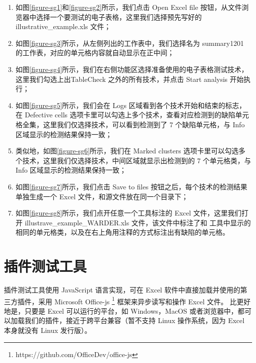 








\begin{enumerate}
    \item 如图\ref{figure-sg1}和\ref{figure-sg2}所示，我们点击 Open Excel file 按钮，从文件浏览器中选择一个要测试的电子表格，这里我们选择预先写好的 illustrative\_example.xls 文件；
    \item 如图\ref{figure-sg3}所示，从左侧列出的工作表中，我们选择名为 summary1201 的工作表，对应的单元格内容就自动显示在正中间；
    \item 如图\ref{figure-sg4}所示，我们在右侧功能区选择准备使用的电子表格测试技术，这里我们勾选上出TableCheck 之外的所有技术，并点击 Start analysis 开始执行；
    \item 如图\ref{figure-sg5}所示，我们会在 Logs 区域看到各个技术开始和结束的标志，在 Defective cells 选项卡里可以勾选上多个技术，查看对应检测到的缺陷单元格全集，这里我们仅选择\wa 技术，可以看到\wa 检测到了 7 个缺陷单元格，与 Info 区域显示的检测结果保持一致；
    \item 类似地，如图\ref{figure-sg6}所示，我们在 Marked clusters 选项卡里可以勾选多个技术，这里我们仅选择\wa 技术，中间区域就显示出\wa 检测到的 7 个单元格类，与 Info 区域显示的检测结果保持一致；
    \item 如图\ref{figure-sg7}所示，我们点击 Save to files 按钮之后，每个技术的检测结果单独生成一个 Excel 文件，和源文件放在同一个目录下；
    \item 如图\ref{figure-sg8}所示，我们点开任意一个工具标注的 Excel 文件，这里我们打开 illustrave\_example\_WARDER.xls 文件，该文件中标注了和 \sg 工具中显示的相同的单元格类，以及在右上角用注释的方式标注出有缺陷的单元格。
\end{enumerate}


\section{\eg 插件测试工具}

\eg 插件测试工具使用 JavaScript 语言实现，可在 Excel 软件中直接加载并使用的第三方插件，采用 Microsoft Office-js \footnote{https://github.com/OfficeDev/office-js} 框架来异步读写和操作 Excel 文件。
比\sg 更好地是，只要是 Excel 可以运行的平台，如 Windows，MacOS 或者浏览器中，都可以加载我们的\eg 插件，接近于跨平台兼容（暂不支持 Linux 操作系统，因为 Excel 本身就没有 Linux 发行版）。

